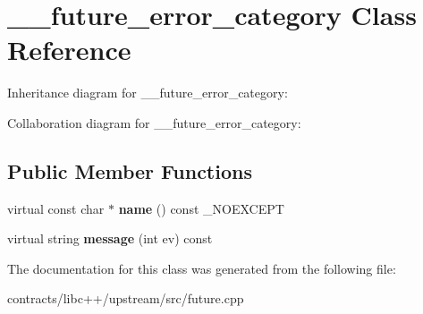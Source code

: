 \hypertarget{class____future__error__category}{}\section{\+\_\+\+\_\+future\+\_\+error\+\_\+category Class Reference}
\label{class____future__error__category}


Inheritance diagram for \+\_\+\+\_\+future\+\_\+error\+\_\+category\+:


Collaboration diagram for \+\_\+\+\_\+future\+\_\+error\+\_\+category\+:
\subsection*{Public Member Functions}
\begin{DoxyCompactItemize}
\item 
\mbox{\label{class____future__error__category_a9fa450cd3db356801b5c0af18b1afebd}} 
virtual const char $\ast$ {\bfseries name} () const \+\_\+\+N\+O\+E\+X\+C\+E\+PT
\item 
\mbox{\label{class____future__error__category_a6d47ae2070b3dc041323bd578af88cd6}} 
virtual string {\bfseries message} (int ev) const
\end{DoxyCompactItemize}


The documentation for this class was generated from the following file\+:\begin{DoxyCompactItemize}
\item 
contracts/libc++/upstream/src/future.\+cpp\end{DoxyCompactItemize}
